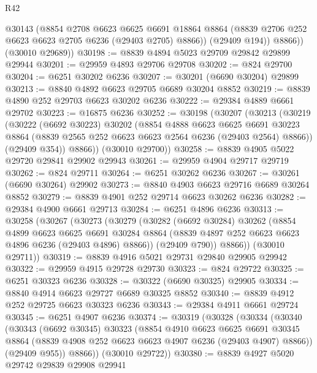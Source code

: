 \begin{lexlean}{R42}
\begin{coremodule}
{            @30143
            (@8854
              @2708
              @6623
              @6625
              @6691
              @18864
              @8864
              (@8839 @2706 @252 @6623 @6623 @2705 @6236 (@29403 @2705) @8866))
            (@29409 @194))
          @8866))
      (@30010 @29689))
@30198 := @8839 @4894 @5023 @29709 @29842 @29899 @29944
@30201 := @29959 @4893 @29706 @29708
@30202 := @824 @29700
@30204 := @6251 @30202 @6236
@30207 := @30201 (@6690 @30204) @29899
@30213 := @8840 @4892 @6623 @29705 @6689 @30204 @8852
@30219 := @8839 @4890 @252 @29703 @6623 @30202 @6236
@30222 := @29384 @4889 @6661 @29702
@30223 := @16875 @6236
@30252 := @30198
    (@30207
      (@30213
        (@30219
          (@30222
            (@6692 @30223)
            @30202
            (@8854
              @4888
              @6623
              @6625
              @6691
              @30223
              @8864
              (@8839 @2565 @252 @6623 @6623 @2564 @6236 (@29403 @2564) @8866))
            (@29409 @354))
          @8866))
      (@30010 @29700))
@30258 := @8839 @4905 @5022 @29720 @29841 @29902 @29943
@30261 := @29959 @4904 @29717 @29719
@30262 := @824 @29711
@30264 := @6251 @30262 @6236
@30267 := @30261 (@6690 @30264) @29902
@30273 := @8840 @4903 @6623 @29716 @6689 @30264 @8852
@30279 := @8839 @4901 @252 @29714 @6623 @30262 @6236
@30282 := @29384 @4900 @6661 @29713
@30284 := @6251 @4896 @6236
@30313 := @30258
    (@30267
      (@30273
        (@30279
          (@30282
            (@6692 @30284)
            @30262
            (@8854
              @4899
              @6623
              @6625
              @6691
              @30284
              @8864
              (@8839 @4897 @252 @6623 @6623 @4896 @6236 (@29403 @4896) @8866))
            (@29409 @790))
          @8866))
      (@30010 @29711))
@30319 := @8839 @4916 @5021 @29731 @29840 @29905 @29942
@30322 := @29959 @4915 @29728 @29730
@30323 := @824 @29722
@30325 := @6251 @30323 @6236
@30328 := @30322 (@6690 @30325) @29905
@30334 := @8840 @4914 @6623 @29727 @6689 @30325 @8852
@30340 := @8839 @4912 @252 @29725 @6623 @30323 @6236
@30343 := @29384 @4911 @6661 @29724
@30345 := @6251 @4907 @6236
@30374 := @30319
    (@30328
      (@30334
        (@30340
          (@30343
            (@6692 @30345)
            @30323
            (@8854
              @4910
              @6623
              @6625
              @6691
              @30345
              @8864
              (@8839 @4908 @252 @6623 @6623 @4907 @6236 (@29403 @4907) @8866))
            (@29409 @955))
          @8866))
      (@30010 @29722))
@30380 := @8839 @4927 @5020 @29742 @29839 @29908 @29941
}
\end{coremodule}
\end{lexlean}
